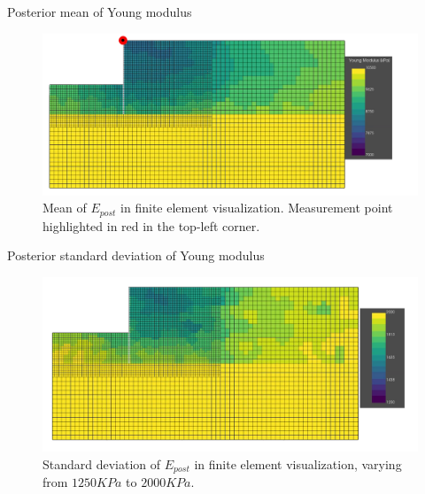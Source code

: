 \documentclass[dvipsnames]{beamer}
\begin{document}
	\begin{frame}{Posterior mean of Young modulus}
	\begin{figure}
	\includegraphics[width=\textwidth]{graphs/final/mean_rf_Eprior=10000_gimped.png}
	\caption{Mean of $E_{post}$ in finite element visualization. Measurement point highlighted in red in the top-left corner.}
	\end{figure}
	\end{frame}
	
	\begin{frame}{Posterior standard deviation of Young modulus}
	\begin{figure}
	\includegraphics[width=\textwidth]{graphs/final/std_rf_Eprior_std=2000_gimped.png}
	\caption{Standard deviation of $E_{post}$ in finite element visualization, varying from $1250 \si{KPa}$ to $2000 \si{KPa}$. }
	\end{figure}
	\end{frame}
	
\end{document}
